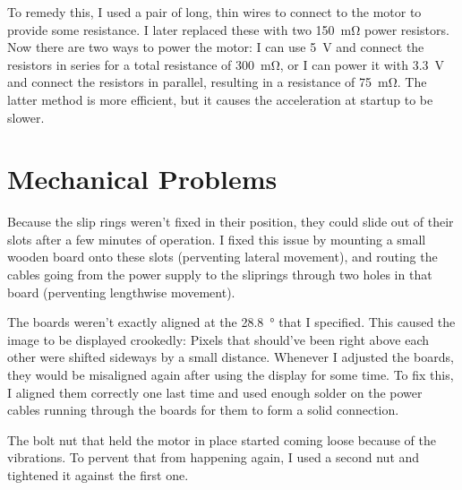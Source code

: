 \documentclass[a4paper, 11pt, titlepage]{report}
\begin{document}
To remedy this, I used a pair of long, thin wires to connect to the motor to provide some
resistance. I later replaced these with two \SI{150}{\milli\ohm} power resistors. Now there are two
ways to power the motor: I can use \SI{5}{\volt} and connect the resistors in series for a total
resistance of \SI{300}{\milli\ohm}, or I can power it with \SI{3.3}{\volt} and connect the
resistors in parallel, resulting in a resistance of \SI{75}{\milli\ohm}. The latter method is more
efficient, but it causes the acceleration at startup to be slower.


\section{Mechanical Problems}

Because the slip rings weren't fixed in their position, they could slide out of their slots after
a few minutes of operation. I fixed this issue by mounting a small wooden board onto these slots
(perventing lateral movement), and routing the cables going from the power supply to the sliprings
through two holes in that board (perventing lengthwise movement).

The boards weren't exactly aligned at the \SI{28.8}{\degree} that I specified. This caused the
image to be displayed crookedly: Pixels that should've been right above each other were shifted
sideways by a small distance. Whenever I adjusted the boards, they would be misaligned again after
using the display for some time. To fix this, I aligned them correctly one last time and used
enough solder on the power cables running through the boards for them to form a solid connection.

The bolt nut that held the motor in place started coming loose because of the vibrations. To
pervent that from happening again, I used a second nut and tightened it against the first one.
\end{document}

